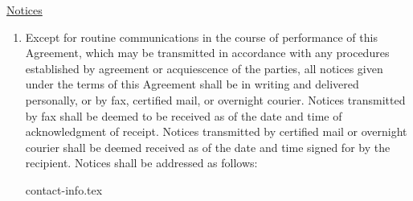 \underline{Notices}
\begin{enumerate}
    \item Except for routine communications in the course of performance of
    this Agreement, which may be transmitted in accordance with any
    procedures established by agreement or acquiescence of the parties, all
    notices given under the terms of this Agreement shall be in writing and
    delivered personally, or by fax, certified mail, or overnight courier.
    Notices transmitted by fax shall be deemed to be received as of the
    date and time of acknowledgment of receipt. Notices transmitted by
    certified mail or overnight courier shall be deemed received as of the
    date and time signed for by the recipient. Notices shall be addressed
    as follows:

    \vspace{1em}
    
    {contact-info.tex}
\end{enumerate}